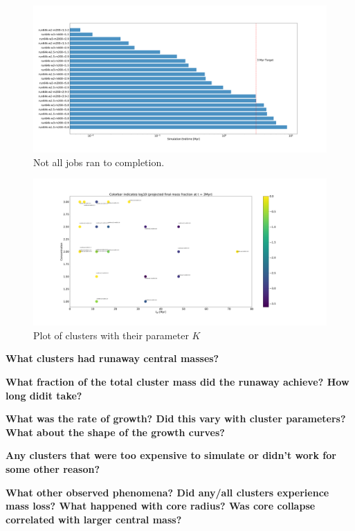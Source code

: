 \documentclass[preprint1]{aastex}
\numberwithin{equation}{section}
\begin{document}
\begin{figure}
    \centering
    \includegraphics{JobProgress}
    \caption{Not all jobs ran to completion.}
    \label{fig:JobProgress}
\end{figure}

\begin{figure}
    \includegraphics[width=20cm]{kplot}
    \caption{Plot of clusters with their parameter $K$}
    \label{fig:KPlot}
\end{figure}
\textbf{What clusters had runaway central masses?}

\textbf{What fraction of the total cluster mass did the runaway achieve?  How long didit take?}

\textbf{What was the rate of growth?  Did this vary with cluster parameters?  What about the shape of the growth curves?}

\textbf{Any clusters that were too expensive to simulate or didn't work for some other reason?}

\textbf{What other observed phenomena?  Did any/all clusters experience mass loss?  What happened with core radius?  Was core collapse correlated with larger central mass?}





\end{document}
